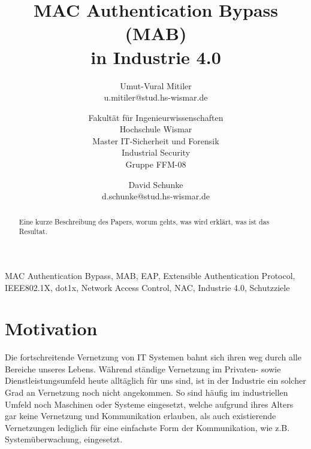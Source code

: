 \documentclass[conference]{IEEEtran}
\begin{document}
\title{MAC Authentication Bypass (MAB)\\ in Industrie 4.0}
\author{
	Umut-Vural Mitiler\\
	u.mitiler@stud.hs-wismar.de
	\and
	Fakultät für Ingenieurwissenschaften\\
	Hochschule Wismar\\
	Master IT-Sicherheit und Forensik\\
	Industrial Security\\
	Gruppe FFM-08
	\and
	David Schunke\\
	d.schunke@stud.hs-wismar.de
}

\maketitle

\thispagestyle{plain}
\pagestyle{plain}

%

\begin{abstract}
Eine kurze Beschreibung des Papers, worum gehts, was wird erklärt, was ist das Resultat.
\end{abstract}

\vspace{1em}

\begin{IEEEkeywords}
MAC Authentication Bypass, MAB, EAP, Extensible Authentication Protocol, IEEE802.1X, dot1x, Network Access Control, NAC, Industrie 4.0, Schutzziele
\end{IEEEkeywords}

%

\section{Motivation}
Die fortschreitende Vernetzung von IT Systemen bahnt sich ihren weg durch alle Bereiche unseres Lebens. Während ständige Vernetzung im Privaten- sowie Dienstleistungsumfeld heute alltäglich für uns sind, ist in der Industrie ein solcher Grad an Vernetzung noch nicht angekommen. So sind häufig im industriellen Umfeld noch Maschinen oder Systeme eingesetzt, welche aufgrund ihres Alters gar keine Vernetzung und Kommunikation erlauben, als auch existierende Vernetzungen lediglich für eine einfachste Form der Kommunikation, wie z.B. Systemüberwachung, eingesetzt.\\
\end{document}
